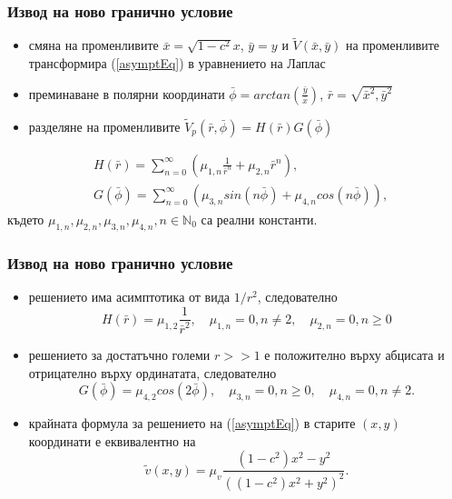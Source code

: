 \documentclass{beamer}
\newcommand{\rf}[1]{(\ref{#1})}
\begin{document}
\begin{frame}
\frametitle{Извод на ново гранично условие}
\begin{itemize}
  \item  смяна на променливите $\bar x  = \sqrt{1-c^2} x$, $\bar y = y$ и $\tilde V (\bar x, \bar y)$ на променливите трансформира \rf{asymptEq} в уравнението на Лаплас
  \item преминаване в полярни координати $\bar \phi = arctan(\frac{\bar y}{\bar x})$, $\bar r = \sqrt{\bar x^2, \bar y^2}$ 
  \item разделяне на променливите $\tilde V_p(\bar r, \bar \phi) = H(\bar r) G(\bar \phi)$
\end{itemize}

\begin{align}\label{LaplaceSol}
&H(\bar{r}) = \sum^{\infty}_{n=0} (\mu_{1,n} \frac{1}{ \bar{r}^n} + \mu_{2,n} \bar{r}^n ),
\\ \nonumber &G(\bar \phi) = \sum^{\infty}_{n=0} (\mu_{3,n}sin(n \bar \phi ) + \mu_{4,n}cos(n \bar \phi)),
\end{align}
където $\mu_{1,n}, \mu_{2,n}, \mu_{3,n}, \mu_{4,n}, n \in \mathbb{N}_{0}$ са реални константи.

\end{frame}


\begin{frame}
\frametitle{Извод на ново гранично условие}
\begin{itemize}
  \item решението има асимптотика от вида $1/r^2$, следователно
	\begin{equation}
	H(\bar r) = \mu_{1,2}\frac{1}{\bar r^2}, \quad \mu_{1,n} = 0, n \neq 2, \quad \mu_{2,n} = 0, n \ge 0
	\end{equation} 
  \item решението за достатъчно големи $r >> 1$ е положително върху абцисата и отрицателно върху ординатата, следователно
\begin{equation}
G(\bar \phi) = \mu_{4,2}cos(2 \bar \phi), \quad \mu_{3,n} = 0, n \ge 0, \quad \mu_{4,n} = 0, n \neq 2.
\end{equation}
  \item крайната формула за решението на \rf{asymptEq} в старите $(x, y)$ координати е еквивалентно на 
\begin{equation}\label{bndv}
\tilde v(x, y) = \mu_v \frac{ (1-c^2) x^2 - y^2 }{ ((1-c^2) x^2 + y^2)^2 }.
\end{equation}
\end{itemize}
\end{frame}
\end{document}
